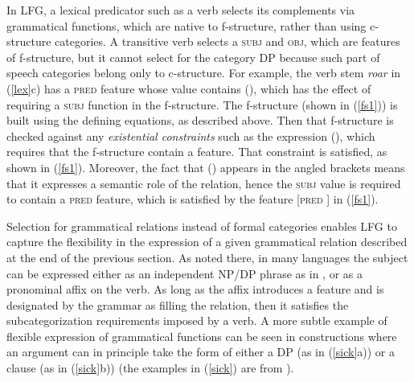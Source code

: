 In LFG, a lexical predicator such as a verb selects its complements via grammatical functions, which are native to f-structure, rather than using c-structure categories.  A transitive verb selects a \textsc{subj} and \textsc{obj}, which are features of f-structure, but it cannot select for the category DP because such part of speech categories belong only to c-structure.  For example, the verb stem \textit{roar} in (\ref{lex}c) has a \textsc{pred} feature whose value contains (\up {}), which has the effect of requiring a \textsc{subj} function in the f-structure.    The f-structure (shown in (\ref{fs1})) is built using the defining equations, as described above.  Then that f-structure is checked against any \textit{existential constraints} such as  the expression (\up {}), which requires that the f-structure contain a  feature.  That constraint is satisfied, as shown in (\ref{fs1}).  Moreover, the fact that (\up {}) appears in the angled brackets means that it expresses a semantic role of the  relation, hence the \textsc{subj} value is required to contain a \textsc{pred} feature, which is satisfied by the feature [\textsc{pred} ] in  (\ref{fs1}).  



Selection for grammatical relations instead of formal categories enables LFG to capture the  flexibility in the expression of a given grammatical relation described at the end of the previous section.  As noted there, in many languages the subject can be expressed either as an independent NP/DP phrase as in , or as a pronominal affix on the verb.  As long as the affix introduces a  feature and is designated by the grammar as filling the  relation, then it satisfies the subcategorization requirements imposed by a verb.  A more subtle example of flexible expression of grammatical functions  can be seen in  constructions where an argument can in principle take the form of either a DP (as in (\ref{sick}a)) or a clause (as in (\ref{sick}b)) (the examples in (\ref{sick}) are from \citealt[11--12]{BATW2016a}).  

\eal 
 \label{sick}




